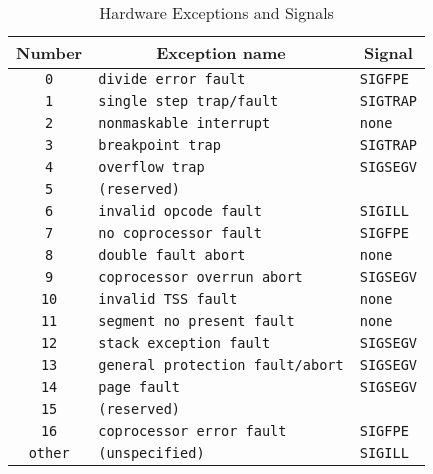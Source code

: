 \begin{table}
\Hrule
  \caption{Hardware Exceptions and Signals}
  \label{tab-hw-exceptions}
  \begin{center}
    \begin{tabular}[t]{c|l|l}
      \multicolumn{1}{c}{Number} & \multicolumn{1}{c}{Exception name}
         & \multicolumn{1}{c}{Signal}\\
      \hline
      \texttt{0} & \texttt{divide error fault} & \texttt{SIGFPE} \\
      \texttt{1} & \texttt{single step trap/fault} & \texttt{SIGTRAP} \\
      \texttt{2} & \texttt{nonmaskable interrupt} & \texttt{none} \\
      \texttt{3} & \texttt{breakpoint trap} & \texttt{SIGTRAP} \\
      \texttt{4} & \texttt{overflow trap} & \texttt{SIGSEGV} \\
      \texttt{5} & \texttt{(reserved)} &\\
      \texttt{6} & \texttt{invalid opcode fault} & \texttt{SIGILL} \\
      \texttt{7} & \texttt{no coprocessor fault} & \texttt{SIGFPE} \\
      \texttt{8} & \texttt{double fault abort} & \texttt{none} \\
      \texttt{9} & \texttt{coprocessor overrun abort} & \texttt{SIGSEGV} \\
      \texttt{10} & \texttt{invalid TSS fault} & \texttt{none} \\
      \texttt{11} & \texttt{segment no present fault} & \texttt{none} \\
      \texttt{12} & \texttt{stack exception fault} & \texttt{SIGSEGV} \\
      \texttt{13} & \texttt{general protection fault/abort}&\texttt{SIGSEGV} \\
      \texttt{14} & \texttt{page fault} & \texttt{SIGSEGV} \\
      \texttt{15} & \texttt{(reserved)} &\\
      \texttt{16} & \texttt{coprocessor error fault} & \texttt{SIGFPE} \\
      \texttt{other} & \texttt{(unspecified)} & \texttt{SIGILL}
    \end{tabular}
  \end{center}
\Hrule
\end{table}

